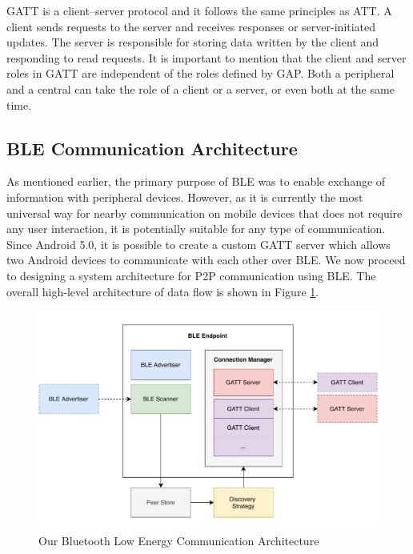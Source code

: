 GATT is a client–server protocol and it follows the same principles as ATT. A client sends requests to the server and receives responses or server-initiated updates. The server is responsible for storing data written by the client and responding to read requests. It is important to mention that the client and server roles in GATT are independent of the roles defined by GAP. Both a peripheral and a central can take the role of a client or a server, or even both at the same time.

\fi



\subsection{BLE Communication Architecture}

As mentioned earlier, the primary purpose of BLE was to enable exchange of information with peripheral devices. However, as it is currently the most universal way for nearby communication on mobile devices that does not require any user interaction, it is potentially suitable for any type of communication. Since Android 5.0, it is possible to create a custom GATT server which allows two Android devices to communicate with each other over BLE. We now proceed to designing a system architecture for P2P communication using BLE. The overall high-level architecture of data flow is shown in Figure \ref{ble_architecture}.

\begin{figure}
    \includegraphics[width=\textwidth]{diagrams/ipv8-ble-architecture}
    \caption{Our Bluetooth Low Energy Communication Architecture}
    \label{ble_architecture}
\end{figure}

